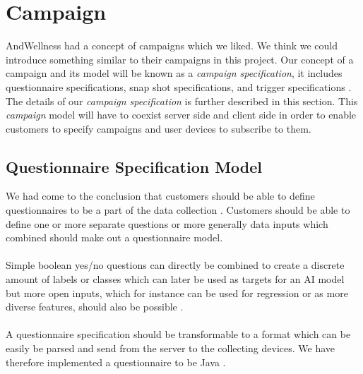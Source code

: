 
\section{Campaign}
\label{sec:campaign}

AndWellness had a concept of campaigns  which we liked. We think we could introduce something similar to their campaigns in this project. Our concept of a campaign and its model will be known as a \textit{campaign specification}, it includes questionnaire specifications, snap shot specifications, and trigger specifications . The details of our \textit{campaign specification} is further described in this section. This \textit{campaign} model will have to coexist server side and client side in order to enable customers to specify campaigns and user devices to subscribe to them.  

\subsection{Questionnaire Specification Model}
\label{sub:questionnaire_model}
We had come to the conclusion that customers should be able to define questionnaires to be a part of the data collection . Customers should be able to define one or more separate questions or more generally data inputs which combined should make out a questionnaire model. 
\\\\
Simple boolean yes/no questions can directly be combined to create a discrete amount of labels or classes which can later be used as targets for an AI model but more open inputs, which for instance can be used for regression or as more diverse features, should also be possible . 
\\\\
A questionnaire specification should be transformable to a format which can be easily be parsed and send from the server to the collecting devices. We have therefore implemented a questionnaire to be Java .  

